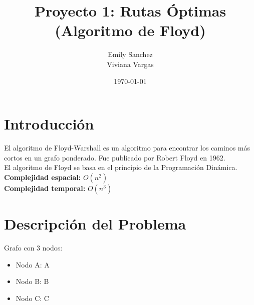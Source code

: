 \documentclass[12pt]{article}
\title{Proyecto 1: Rutas Óptimas (Algoritmo de Floyd)}
\author{Emily Sanchez \\ Viviana Vargas}
\date{\today}
\begin{document}
\maketitle
\thispagestyle{empty}
\newpage
\setcounter{page}{1}

\section{Introducción}
El algoritmo de Floyd-Warshall es un algoritmo para encontrar los caminos más cortos en un grafo ponderado. Fue publicado por Robert Floyd en 1962.\\
El algoritmo de Floyd se basa en el principio de la Programación Dinámica.\\
\textbf{Complejidad espacial:} $O(n^2)$\\
\textbf{Complejidad temporal:} $O(n^3)$\\
\clearpage
\section{Descripción del Problema}
Grafo con 3 nodos:

\begin{itemize}
\item Nodo A: A
\item Nodo B: B
\item Nodo C: C
\end{itemize}
\end{document}
